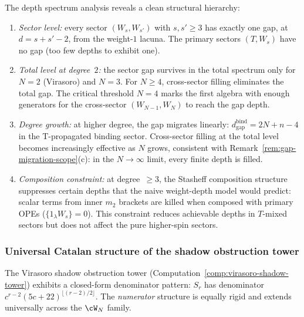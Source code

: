 \begin{remark}%
\label{rem:depth-landscape-summary}%
%
The depth spectrum analysis reveals a clean structural
hierarchy:
\begin{enumerate}[label=\textup{(\roman*)}]
\item \emph{Sector level:} every sector $(W_s, W_{s'})$
 with $s, s' \ge 3$ has exactly one gap, at
 $d = s + s' - 2$, from the weight-$1$ lacuna.
 The primary sectors $(T, W_s)$ have no gap (too few
 depths to exhibit one).
\item \emph{Total level at degree~$2$:} the sector gap
 survives in the total spectrum only for
 $N = 2$ \textup{(Virasoro)} and $N = 3$.
 For $N \ge 4$, cross-sector filling eliminates the
 total gap. The critical threshold $N = 4$ marks the
 first algebra with enough generators for the
 cross-sector $(W_{N-1}, W_N)$ to reach the gap depth.
\item \emph{Degree growth:} at higher degree, the gap
 migrates linearly:
 \(d_{\mathrm{gap}}^{\mathrm{bind}}=2N+n-4\)
 in the T-propagated binding sector. Cross-sector filling
 at the total level becomes increasingly effective as
 $N$ grows, consistent with
 Remark~\ref{rem:gap-migration-scope}(c):
 in the $N \to \infty$ limit, every finite depth
 is filled.
\item \emph{Composition constraint:} at degree~$\ge 3$,
 the Stasheff composition structure suppresses certain
 depths that the naive weight-depth model would predict:
 scalar terms from inner $m_2$ brackets are killed when
 composed with primary OPEs ($\{1_\lambda W_s\} = 0$).
 This constraint reduces achievable depths in $T$-mixed
 sectors but does not affect the pure higher-spin sectors.
\end{enumerate}
\end{remark}

\subsubsection{Universal Catalan structure of the shadow obstruction tower}
\label{subsubsec:catalan-shadow}

The Virasoro shadow obstruction tower
(Computation~\ref{comp:virasoro-shadow-tower}) exhibits a
closed-form denominator pattern:
$S_r$ has denominator $c^{r-2}(5c+22)^{\lfloor(r-2)/2\rfloor}$.
The \emph{numerator} structure is equally rigid and extends
universally across the $\cW_N$ family.

